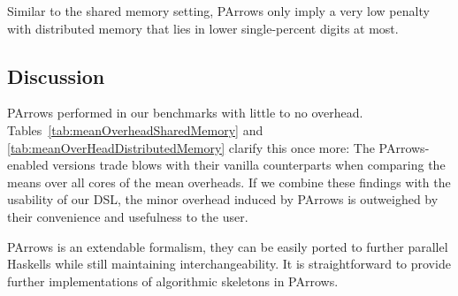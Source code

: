 Similar to the shared memory setting, PArrows only imply a very low penalty with distributed memory that lies in lower single-percent digits at most.

\subsection{Discussion}



PArrows performed in our benchmarks with little to no overhead. Tables~\ref{tab:meanOverheadSharedMemory} and \ref{tab:meanOverHeadDistributedMemory} clarify this once more: The PArrows-enabled versions trade blows with their vanilla counterparts when comparing the means over all cores of the mean overheads. If we combine these findings with the usability of our DSL,
the minor overhead induced by PArrows is outweighed by their convenience and usefulness to the user.

PArrows is an extendable formalism, they can be easily ported to further parallel Haskells while still maintaining interchangeability. It is straightforward to provide further implementations of algorithmic skeletons in PArrows.
